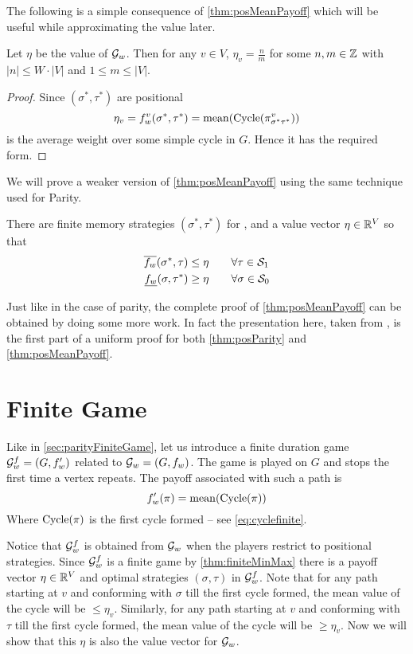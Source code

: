 The following is a simple consequence of \autoref{thm:posMeanPayoff} which will be useful while approximating the value later.
\begin{corollary}
    \label{cor:valMeanPayoff}
    Let $\eta$ be the value of $\mathcal{G}_w$. Then for any $v \in V$,
  $\eta_v=\frac{n}{m}$ for some $n,m \in \mathbb{Z}$ with $|n| \leq W \cdot |V|$ and $1 \leq m \leq |V|$.
\end{corollary}
\begin{proof}
     Since $(\sigma^*,\tau^*)$ are positional
    \[
        \eta_v = f^v_w(\sigma^*,\tau^*) = \operatorname*{mean}(\operatorname{Cycle}(\pi^v_{\sigma^*\tau^*}))
    \]
    is the average weight over some simple cycle in $G$. Hence it has the required form.
\end{proof}
We will prove a weaker version of \autoref{thm:posMeanPayoff} using the same technique used for Parity.
\begin{theorem}
    \label{thm:meanEquilibrium}
    There are finite memory strategies $(\sigma^*,\tau^*)$ for ,  and a value vector $\eta \in \mathbb{R}^V$ so that
    \begin{equation*}
        \begin{aligned}
            \overline{f_w}(\sigma^*,\tau) &\leq \eta \qquad \forall \tau \in \mathcal{S}_1\\
            \underline{f_w}(\sigma,\tau^*) &\geq \eta \qquad \forall \sigma \in \mathcal{S}_0
        \end{aligned}
    \end{equation*}
\end{theorem}
Just like in the case of parity, the complete proof of \autoref{thm:posMeanPayoff} can be obtained by doing some more work. In fact the presentation here, taken from \cite{bjorklund_memoryless_2004}, is the first part of a uniform proof for both \autoref{thm:posParity} and \autoref{thm:posMeanPayoff}.

\section{Finite Game}
Like in \autoref{sec:parityFiniteGame}, let us introduce a finite duration game $\mathcal{G}^f_w=(G,f'_w)$ related to $\mathcal{G}_w=(G,f_w)$. The game is played on $G$ and stops the first time a vertex repeats. The payoff associated with such a path is
\[
    f'_w(\pi) = \operatorname*{mean}(\operatorname{Cycle}(\pi))
\]
Where $\operatorname{Cycle}(\pi)$ is the first cycle formed -- see \eqref{eq:cyclefinite}.

Notice that $\mathcal{G}^f_w$ is obtained from $\mathcal{G}_w$ when the players restrict to positional strategies. Since $\mathcal{G}^f_w$  is a finite game by \autoref{thm:finiteMinMax} there is a payoff vector $\eta \in \mathbb{R}^V$ and optimal strategies $(\sigma,\tau)$ in $\mathcal{G}^f_w$. Note that for any path starting at $v$ and conforming with $\sigma$ till the first cycle formed, the mean value of the cycle will be $\leq \eta_v$. Similarly, for any path starting at $v$ and conforming with $\tau$ till the first cycle formed, the mean value of the cycle will be $\geq \eta_v$.  Now we will show that this $\eta$ is also the value vector for $\mathcal{G}_w$.

